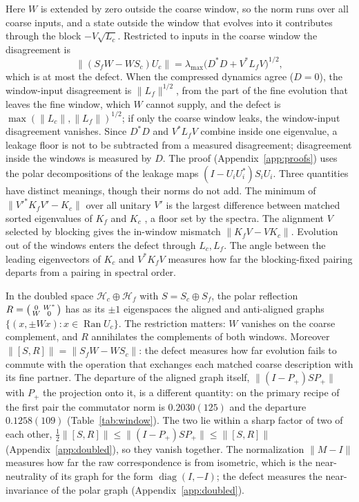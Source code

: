 \documentclass[11pt]{article}
\newcommand{\lmax}{\lambda_{\max}}
\begin{document}
Here $W$ is extended by zero outside the coarse window, so the norm runs over all coarse inputs, and a
state outside the window that evolves into it contributes through the block $-V\sqrt{L_c}$. Restricted
to inputs in the coarse window the disagreement is
\begin{equation}
 \|(S_fW-WS_c)U_c\|=\lmax\bigl(D^*D+V^*L_fV\bigr)^{1/2},
\end{equation}
which is at most the defect. When the compressed dynamics agree ($D=0$), the window-input disagreement
is $\|L_f\|^{1/2}$, from the part of the fine evolution that leaves the fine window, which $W$ cannot
supply, and the defect is $\max(\|L_c\|,\|L_f\|)^{1/2}$; if only the coarse window leaks, the window-input
disagreement vanishes.
Since $D^*D$ and $V^*L_fV$ combine inside one eigenvalue, a leakage floor is not to be subtracted from a
measured disagreement; disagreement inside the windows is measured by $D$. The proof (Appendix~\ref{app:proofs}) uses the polar decompositions of the
leakage maps $(I-U_iU_i^*)S_iU_i$. Three quantities have distinct meanings, though their norms do not add. The minimum
of $\|V'^*K_fV'-K_c\|$ over all unitary $V'$ is the largest difference between matched sorted eigenvalues
of $K_f$ and $K_c$ \cite{Bhatia}, a floor set by the spectra. The alignment $V$ selected by blocking gives
the in-window mismatch $\|K_fV-VK_c\|$. Evolution out of the windows enters the defect through $L_c,L_f$.
The angle between the leading eigenvectors of $K_c$ and $V^*K_fV$ measures how far the blocking-fixed
pairing departs from a pairing in spectral order.

In the doubled space $\mathcal H_c\oplus\mathcal H_f$ with $S=S_c\oplus S_f$, the polar reflection
$R=\begin{psmallmatrix}0&W^*\\W&0\end{psmallmatrix}$ has as its $\pm1$ eigenspaces the aligned and
anti-aligned graphs $\{(x,\pm Wx):x\in\operatorname{Ran}U_c\}$. The restriction matters: $W$ vanishes on the
coarse complement, and $R$ annihilates the complements of both windows. Moreover $\|[S,R]\|=\|S_fW-WS_c\|$:
the defect measures how far evolution fails to commute with the operation that exchanges each matched
coarse description with its fine partner. The departure of the aligned graph itself,
$\|(I-P_+)SP_+\|$ with $P_+$ the projection onto it, is a different quantity: on the primary recipe of the
first pair the commutator norm is $0.2030(125)$ and the departure $0.1258(109)$ (Table~\ref{tab:window}).
The two lie within a sharp factor of two of each other, $\tfrac12\|[S,R]\|\le\|(I-P_+)SP_+\|\le\|[S,R]\|$
(Appendix~\ref{app:doubled}), so they vanish together.
The normalization $\|M-I\|$ measures how far the raw correspondence is from isometric, which is the
near-neutrality of its graph for the form $\operatorname{diag}(I,-I)$; the defect measures the
near-invariance of the polar graph (Appendix~\ref{app:doubled}).
\end{document}
